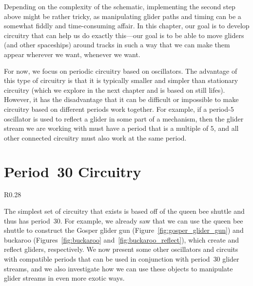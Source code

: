 Depending on the complexity of the schematic, implementing the second step above might be rather tricky, as manipulating glider paths and timing can be a somewhat fiddly and time-consuming affair. In this chapter, our goal is to develop circuitry that can help us do exactly this---our goal is to be able to move gliders (and other spaceships) around tracks in such a way that we can make them appear wherever we want, whenever we want.

For now, we focus on periodic circuitry based on oscillators. The advantage of this type of circuitry is that it is typically smaller and simpler than stationary circuitry (which we explore in the next chapter and is based on still lifes). However, it has the disadvantage that it can be difficult or impossible to make circuitry based on different periods work together. For example, if a period-$5$ oscillator is used to reflect a glider in some part of a mechanism, then the glider stream we are working with must have a period that is a multiple of $5$, and all other connected circuitry must also work at the same period.


\section{Period~30 Circuitry}\label{sec:p30}

\begin{wrapfigure}{R}{0.28\textwidth}
	\centering\vspace*{-0.8cm}
	\caption{A buckaroo can reflect a glider by $90$~degrees, from the position marked in  to the one in  $30$ generations later.}\label{fig:buckaroo_reflect}
\end{wrapfigure}
The simplest set of circuitry that exists is based off of the queen bee shuttle and thus has period~$30$. For example, we already saw that we can use the queen bee shuttle to construct the Gosper glider gun (Figure~\ref{fig:gosper_glider_gun}) and buckaroo (Figures~\ref{fig:buckaroo} and~\ref{fig:buckaroo_reflect}), which create and reflect gliders, respectively. We now present some other oscillators and circuits with compatible periods that can be used in conjunction with period~$30$ glider streams, and we also investigate how we can use these objects to manipulate glider streams in even more exotic ways.


